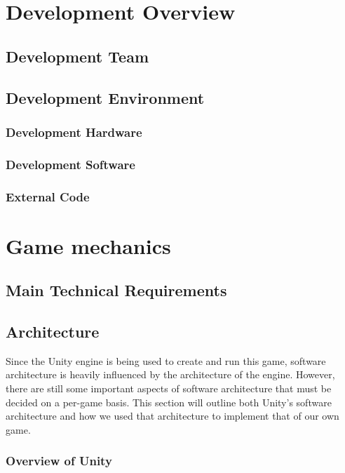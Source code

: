 \documentclass{article}
\begin{document}
\section{Development Overview}

\subsection{Development Team}

\subsection{Development Environment}

\subsubsection{Development Hardware}

\subsubsection{Development Software}

\subsubsection{External Code}

\section{Game mechanics}

\subsection{Main Technical Requirements}

\subsection{Architecture}

Since the Unity engine is being used to create and run this game, software architecture is heavily influenced by the architecture of the engine.  However, there are still some important aspects of software architecture that must be decided on a per-game basis.  This section will outline both Unity's software architecture and how we used that architecture to implement that of our own game.

\subsubsection{Overview of Unity}
\end{document}
